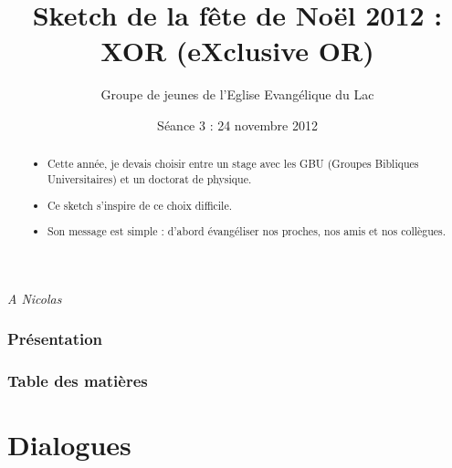 \documentclass{article}
\title[XOR]{Sketch de la fête de Noël 2012 :\\ XOR (eXclusive OR)}
\author[EEL.GdJ]{Groupe de jeunes de l'Eglise Evangélique du Lac}
\date{Séance 3 : 24 novembre 2012}
\begin{document}
\begin{frame}
\titlepage
\end{frame}

\begin{frame}
\textit{A Nicolas}
\end{frame}

\begin{frame}
\frametitle{Présentation}
\begin{abstract}
	\begin{itemize}
	\item Cette année, je devais choisir entre un stage avec les GBU
	(Groupes Bibliques Universitaires) et un doctorat de physique.
	\item Ce sketch s'inspire de ce choix difficile.
	\item Son message est simple : d'abord évangéliser nos proches,
	nos amis et nos collègues.
	\end{itemize}
\end{abstract}
\end{frame}

\begin{frame}[allowframebreaks]
\frametitle{Table des matières}
\setcounter{tocdepth}{2}
\tableofcontents
\end{frame}


	


\section{Dialogues}

\begin{frame}
\sectionFrame{}
\end{frame}

	
	
	




	
\end{document}
